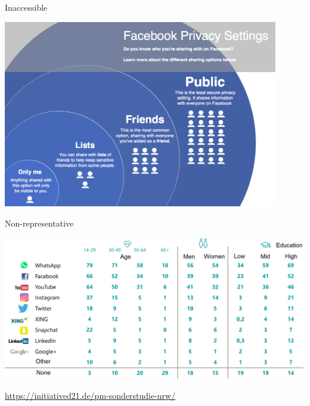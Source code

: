 \documentclass{beamer}
\def\vf{\vfill}
\begin{document}
\begin{frame}{Inaccessible}

\begin{center}
	\includegraphics[width=0.9\textwidth]{figures/2014_under_infographic.png}
\end{center}

\end{frame}

\begin{frame}{Non-representative}

\begin{center}
	\includegraphics[width=1\textwidth]{figures/nrw_d21_socialmedia.png}
\end{center}

\vf
\tiny{\url{https://initiatived21.de/pm-sonderstudie-nrw/}}

\end{frame}
\end{document}
